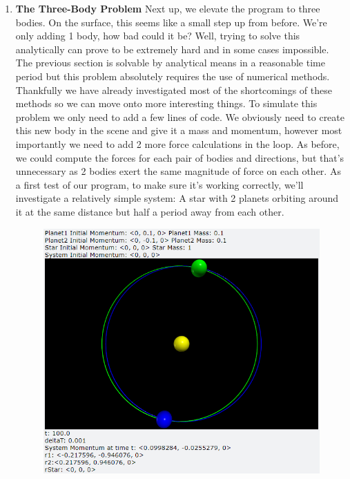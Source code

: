 \documentclass[12pt]{article}
\begin{document}
\begin{enumerate}
        \item \textbf{The Three-Body Problem} \newline
        Next up, we elevate the program to three bodies. On the surface, this seems like a small step 
        up from before. We're only adding 1 body, how bad could it be? Well, trying to solve this 
        analytically can prove to be extremely hard and in some cases impossible. The previous section 
        is solvable by analytical means in a reasonable time period but this problem absolutely 
        requires the use of numerical methods. Thankfully we have already investigated most of the 
        shortcomings of these methods so we can move onto more interesting things. \newline
        To simulate this problem we only need to add a few lines of code. We obviously need to create 
        this new body in the scene and give it a mass and momentum, however most importantly we need 
        to add 2 more force calculations in the loop. As before, we could compute the forces for each 
        pair of bodies and directions, but that's unnecessary as 2 bodies exert the same magnitude of 
        force on each other. \newline
        As a first test of our program, to make sure it's working correctly, we'll investigate a 
        relatively simple system: A star with 2 planets orbiting around it at the same distance but 
        half a period away from each other.
        \begin{figure}[H]
            \begin{center}
               \includegraphics[scale=.5]{ThreeBody1.png}

\end{center}
\end{figure}
\end{enumerate}
\end{document}
